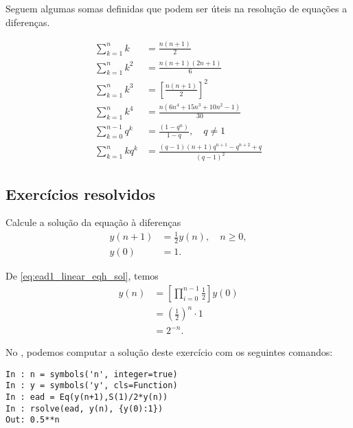 Seguem algumas somas definidas que podem ser úteis na resolução de equações a diferenças.

\begin{align}
  \sum_{k=1}^{n} k &= \frac{n(n+1)}{2}\\
  \sum_{k=1}^{n} k^2 &= \frac{n(n+1)(2n+1)}{6}\\
  \sum_{k=1}^n k^3 &= \left[\frac{n(n+1)}{2}\right]^2\\
  \sum_{k=1}^n k^4 &= \frac{n(6n^4+15n^3+10n^2-1)}{30}\\
  \sum_{k=0}^{n-1}q^k &= \frac{(1-q^n)}{1-q},\quad q\neq 1\label{eq:ead1_eqlin_spg}\\
  \sum_{k=1}^n kq^k &= \frac{(q-1)(n+1)q^{n+1}-q^{n+2}+q}{(q-1)^2}
\end{align}

\subsection*{Exercícios resolvidos}

\begin{exeresol}
  Calcule a solução da equação à diferenças
  \begin{align}
    y(n+1) &= \frac{1}{2}y(n),\quad n\geq 0,\\
    y(0) &= 1.
  \end{align}
\end{exeresol}
\begin{resol}
  De \eqref{eq:ead1_linear_eqh_sol}, temos
  \begin{align}
    y(n) &= \left[\prod_{i=0}^{n-1} \frac{1}{2}\right]y(0)\\
         &= \left(\frac{1}{2}\right)^{n}\cdot 1 \\
         &= 2^{-n}.
  \end{align}

  \ifispython
  No \python, podemos computar a solução deste exercício com os seguintes comandos:
\begin{verbatim}
In : n = symbols('n', integer=true)
In : y = symbols('y', cls=Function)
In : ead = Eq(y(n+1),S(1)/2*y(n))
In : rsolve(ead, y(n), {y(0):1})
Out: 0.5**n
\end{verbatim}
  \fi
\end{resol}

